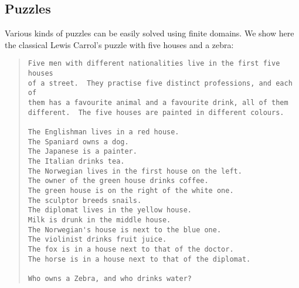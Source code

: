\subsection{Puzzles}
Various kinds of puzzles can be easily solved using finite domains.
We show here the classical Lewis Carrol's puzzle with five houses and a zebra:
\begin{quote}
\begin{verbatim}
Five men with different nationalities live in the first five houses
of a street.  They practise five distinct professions, and each of
them has a favourite animal and a favourite drink, all of them
different.  The five houses are painted in different colours.

The Englishman lives in a red house.
The Spaniard owns a dog.
The Japanese is a painter.
The Italian drinks tea.
The Norwegian lives in the first house on the left.
The owner of the green house drinks coffee.
The green house is on the right of the white one.
The sculptor breeds snails.
The diplomat lives in the yellow house.
Milk is drunk in the middle house.
The Norwegian's house is next to the blue one.
The violinist drinks fruit juice.
The fox is in a house next to that of the doctor.
The horse is in a house next to that of the diplomat.

Who owns a Zebra, and who drinks water?
\end{verbatim}
\end{quote}

